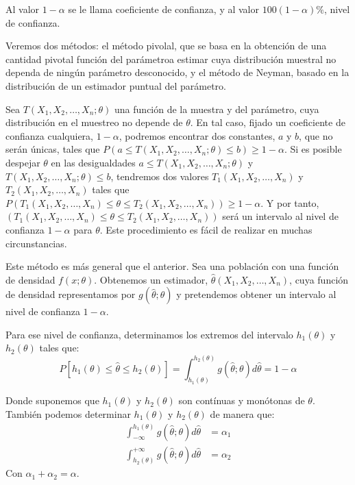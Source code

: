 Al valor $1-\alpha$ se le llama coeficiente de confianza, y al valor $100(1-\alpha)\%$, nivel de confianza.


Veremos dos m\'etodos: el m\'etodo pivolal, que se basa en la obtenci\'on de una cantidad pivotal funci\'on del par\'ametroa estimar cuya distribuci\'on muestral no dependa de ning\'un par\'ametro desconocido, y el m\'etodo de Neyman, basado en la distribuci\'on de un estimador puntual del par\'ametro.


Sea $T(X_1,X_2,\ldots,X_n;\theta)$ una funci\'on de la muestra y del par\'ametro, cuya distribuci\'on en el muestreo no depende de $\theta$. En tal caso, fijado un coeficiente de confianza cualquiera, $1-\alpha$, podremos encontrar dos constantes, $a$ y $b$, que no ser\'an \'unicas, tales que $P(a\leq T(X_1,X_2,\ldots,X_n;\theta)\leq b)\geq 1-\alpha$. Si es posible despejar $\theta$ en las desigualdades $a\leq T(X_1,X_2,\ldots,X_n;\theta)$ y $T(X_1,X_2,\ldots,X_n;\theta)\leq b$, tendremos dos valores $T_1(X_1,X_2,\ldots,X_n)$ y $T_2(X_1,X_2,\ldots,X_n)$ tales que $P(T_1(X_1,X_2,\ldots,X_n)\leq\theta\leq T_2(X_1,X_2,\ldots,X_n))\geq 1-\alpha$. Y por tanto, $(T_1(X_1,X_2,\ldots,X_n)\leq\theta\leq T_2(X_1,X_2,\ldots,X_n))$ ser\'a un intervalo al nivel de confianza $1-\alpha$ para $\theta$. Este procedimiento es f\'acil de realizar en muchas circunstancias.


Este m\'etodo es m\'as general que el anterior. Sea una poblaci\'on con una funci\'on de densidad $f(x;\theta)$. Obtenemos un estimador, $\hat{\theta}(X_1,X_2,\ldots,X_n)$, cuya funci\'on de densidad representamos por $g(\hat{\theta};\theta)$ y pretendemos obtener un intervalo al nivel de confianza $1-\alpha$.

Para ese nivel de confianza, determinamos los extremos del intervalo $h_1(\theta)$ y $h_2(\theta)$ tales que:
\begin{equation*}
P[h_1(\theta)\leq\hat{\theta}\leq h_2(\theta)]=\int_{h_1(\theta)}^{h_2(\theta)}g(\hat{\theta};\theta)d\hat{\theta}=1-\alpha
\end{equation*}

Donde suponemos que $h_1(\theta)$ y $h_2(\theta)$ son cont\'inuas y mon\'otonas de $\theta$. Tambi\'en podemos determinar $h_1(\theta)$ y $h_2(\theta)$  de manera que:
\begin{align*}
\int_{-\infty}^{h_1(\theta)}g(\hat{\theta};\theta)d\hat{\theta}&=\alpha_1 \\
\int_{h_2(\theta)}^{+\infty}g(\hat{\theta};\theta)d\hat{\theta}&=\alpha_2
\end{align*}
Con $\alpha_1+\alpha_2=\alpha$.

